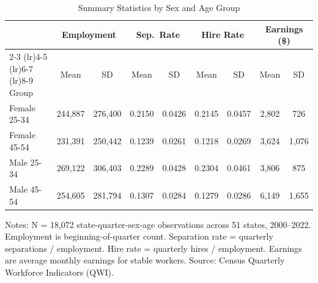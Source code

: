 \begin{table}[H]
\centering
\caption{Summary Statistics by Sex and Age Group}
\begin{threeparttable}
\begin{tabular}{lcccccccc}
\toprule
 & \multicolumn{2}{c}{Employment} & \multicolumn{2}{c}{Sep.\ Rate} & \multicolumn{2}{c}{Hire Rate} & \multicolumn{2}{c}{Earnings (\$)} \\
\cmidrule(lr){2-3} \cmidrule(lr){4-5} \cmidrule(lr){6-7} \cmidrule(lr){8-9}
Group & Mean & SD & Mean & SD & Mean & SD & Mean & SD \\
\midrule
Female 25-34 & 244,887 & 276,400 & 0.2150 & 0.0426 & 0.2145 & 0.0457 & 2,802 & 726 \\
Female 45-54 & 231,391 & 250,442 & 0.1239 & 0.0261 & 0.1218 & 0.0269 & 3,624 & 1,076 \\
Male 25-34 & 269,122 & 306,403 & 0.2289 & 0.0428 & 0.2304 & 0.0461 & 3,806 & 875 \\
Male 45-54 & 254,605 & 281,794 & 0.1307 & 0.0284 & 0.1279 & 0.0286 & 6,149 & 1,655 \\
\bottomrule
\end{tabular}
\begin{tablenotes}[flushleft]
\small
\item Notes: N = 18,072 state-quarter-sex-age observations across 51 states, 2000--2022. Employment is beginning-of-quarter count. Separation rate = quarterly separations / employment. Hire rate = quarterly hires / employment. Earnings are average monthly earnings for stable workers. Source: Census Quarterly Workforce Indicators (QWI).
\end{tablenotes}
\end{threeparttable}
\label{tab:summary}
\end{table}

